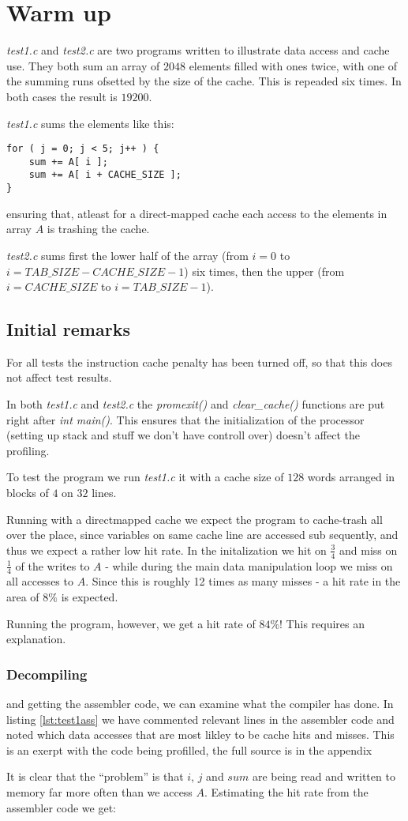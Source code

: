 \section{Warm up}
\emph{test1.c} and \emph{test2.c} are two programs written to illustrate data
access and cache use. They both sum an array of $2048$ elements filled with ones
twice, with one of the summing runs ofsetted by the size of the cache. This is repeaded six
times. In both cases the result is $19200$.

\emph{test1.c} sums the elements like this:
\begin{lstlisting}
for ( j = 0; j < 5; j++ ) {
	sum += A[ i ];
	sum += A[ i + CACHE_SIZE ];
}
\end{lstlisting}
ensuring that, atleast for a direct-mapped cache each access to the elements in
array $A$ is trashing the cache.

\emph{test2.c} sums first the lower half of the array (from $i=0$ to
$i=TAB\_SIZE-CACHE\_SIZE-1$) six times, then the upper (from $i=CACHE\_SIZE$ to
$i=TAB\_SIZE-1$).

\subsection{Initial remarks}
For all tests the instruction cache penalty has been turned off, so that this
does not affect test results.

In both \emph{test1.c} and \emph{test2.c} the \emph{promexit()} and
\emph{clear\_cache()} functions are put right after \emph{int main()}. This
ensures that the initialization of the processor (setting up stack and stuff we
don't have controll over) doesn't affect the profiling.

To test the program we run \emph{test1.c} it with a cache size of $128$ words
arranged in blocks of $4$ on $32$ lines.

Running with a directmapped cache we expect the program to cache-trash all over
the place, since variables on same cache line are accessed sub sequently, and
thus we expect a rather low hit rate.
In the initalization we hit on $\frac{3}{4}$ and miss on $\frac{1}{4}$ of the writes to $A$ - while during
the main data manipulation loop we miss on all accesses to $A$. Since this is
roughly 12 times as many misses - a hit rate in the area of $8\%$ is expected. 

Running the program, however, we get a hit rate of $84\%$! This requires an
explanation.
\subsubsection{Decompiling} and getting the assembler code, we can examine what
the compiler has done. In listing \ref{lst:test1ass} we have commented relevant
lines in the assembler code and noted which data accesses that are most likley
to be cache hits and misses. This is an exerpt with the code being profilled,
the full source is in the appendix

It is clear that the ``problem'' is that $i$,
$j$ and $sum$ are being read and written to memory far more often than we access $A$.
Estimating the hit rate from the assembler code we get:

